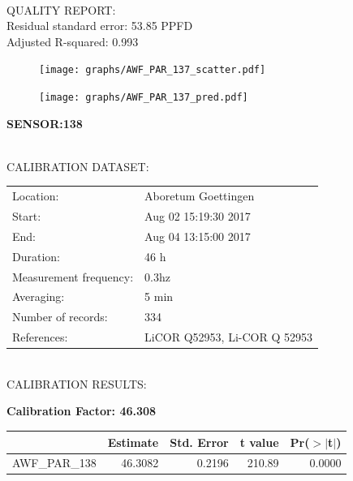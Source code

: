 \documentclass[oneside]{report}
\begin{document}
\hrulefill\\
QUALITY REPORT:\\
Residual standard error: 53.85 PPFD\\
Adjusted R-squared: 0.993



\begin{figure}[H]
  \centering
  \texttt{[image: graphs/AWF\_PAR\_137\_scatter.pdf]}
\end{figure}




\begin{figure}[H]
  \centering
  \texttt{[image: graphs/AWF\_PAR\_137\_pred.pdf]}
\end{figure}

\pagebreak


\begin{center}
\large{\textbf{SENSOR:138}}\\
\end{center}

\hrulefill\\
CALIBRATION DATASET:\\
\begin{table}[h!]
  \centering
  \label{tab:table1}
  \begin{tabular}{ll}
    Location: & Aboretum Goettingen\\ 
    
    
    Start:  & Aug 02 15:19:30 2017 \\
    End:   & Aug 04 13:15:00 2017\\ 
    Duration: & 46 h\\
    Measurement frequency: & 0.3hz\\
    Averaging:  &5 min\\
    Number of records: & 334 \\
    References: & LiCOR Q52953, Li-COR Q 52953 \\
  \end{tabular}
\end{table}

\hrulefill\\
CALIBRATION RESULTS:\\


\begin{center}
\textbf{\large{Calibration Factor: 46.308}}\\
\end{center}
\begin{table}[ht]
\centering
\begin{tabular}{rrrrr}
  \hline
 & Estimate & Std. Error & t value & Pr($>$$|$t$|$) \\ 
  \hline
AWF\_PAR\_138 & 46.3082 & 0.2196 & 210.89 & 0.0000 \\ 
   \hline
\end{tabular}
\end{table}
\end{document}
